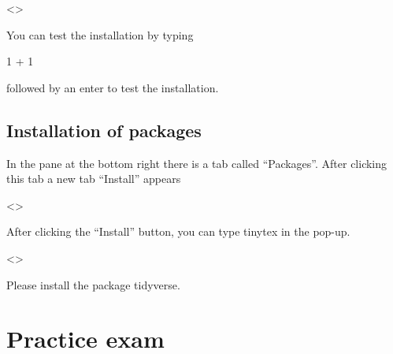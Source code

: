 \documentclass[
]{book}
\begin{document}
\textless{}\textgreater{}

You can test the installation by typing

1 + 1

followed by an enter to test the installation.

\hypertarget{installation-of-packages}{%
\section{Installation of packages}\label{installation-of-packages}}

In the pane at the bottom right there is a tab called ``Packages''.
After clicking this tab a new tab ``Install'' appears

\textless{}\textgreater{}

After clicking the ``Install'' button, you can type tinytex in the pop-up.

\textless{}\textgreater{}

Please install the package tidyverse.

\hypertarget{practice-exam}{%
\chapter{Practice exam}\label{practice-exam}}

  
\end{document}
